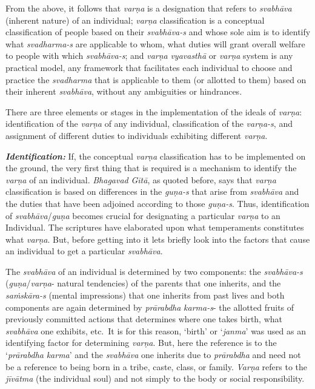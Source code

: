 From the above, it follows that \emph{varṇa} is a designation that refers to \emph{svabhāva} (inherent nature) of an individual; \emph{varṇa} classification is a conceptual classification of people based on their \emph{svabhāva-s} and whose sole aim is to identify what \emph{svadharma-s} are applicable to whom, what duties will grant overall welfare to people with which \emph{svabhāva-s}; and \emph{varṇa} \emph{vyavasthā} or \emph{varṇa} system is any practical model, any framework that facilitates each individual to choose and practice the \emph{svadharma} that is applicable to them (or allotted to them) based on their inherent \emph{svabhāva}, without any ambiguities or hindrances.

There are three elements or stages in the implementation of the ideals of \emph{varṇa}: identification of the \emph{varṇa} of any individual, classification of the \emph{varṇa-s}, and assignment of different duties to individuals exhibiting different \emph{varṇa}.

\emph{\textbf{Identification:}} If, the conceptual \emph{varṇa} classification has to be implemented on the ground, the very first thing that is required is a mechanism to identify the \emph{varṇa} of an individual. \emph{Bhagavad} \emph{Gītā}, as quoted before, says that \emph{varṇa} classification is based on differences in the \emph{guṇa-s} that arise from \emph{svabhāva} and the duties that have been adjoined according to those \emph{guṇa-s}. Thus, identification of \emph{svabhāva}/\emph{guṇa} becomes crucial for designating a particular \emph{varṇa} to an Individual. The scriptures have elaborated upon what temperaments constitutes what \emph{varṇa}. But, before getting into it lets briefly look into the factors that cause an individual to get a particular \emph{svabhāva}.

The \emph{svabhāva} of an individual is determined by two components: the \emph{svabhāva-s} (\emph{guṇa}/\emph{varṇa}- natural tendencies) of the parents that one inherits, and the \emph{saṁskāra-s} (mental impressions) that one inherits from past lives and both components are again determined by \emph{prārabdha} \emph{karma-s}- the allotted fruits of previously committed actions that determines where one takes birth, what \emph{svabhāva} one exhibits, etc.\ It is for this reason, `birth' or `\emph{janma}' was used as an identifying factor for determining \emph{varṇa}. But, here the reference is to the `\emph{prārabdha} \emph{karma}' and the \emph{svabhāva} one inherits due to \emph{prārabdha} and need not be a reference to being born in a tribe, caste, class, or family. \emph{Varṇa} refers to the \emph{jīvātma} (the individual soul) and not simply to the body or social responsibility.

